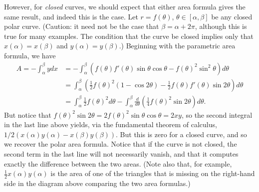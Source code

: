 \documentclass[letterpaper,12pt]{article}
\newcommand{\di}{\displaystyle}
\begin{document}
However, for {\em closed} curves, we should expect that either area formula gives the same result, and indeed this is the case. Let $r=f(\theta)$, $\theta\in [\alpha,\beta]$ be any closed polar curve. (Caution: it need not be the case that $\beta = \alpha+2\pi$, although this is true for many examples. The condition that the curve be closed implies only that $x(\alpha)=x(\beta)$ and $y(\alpha)=y(\beta)$.)
Beginning with the parametric area formula, we have
\begin{align*}
A = -\int_\alpha^\beta y dx & = -\int_\alpha^\beta \left(f(\theta)f'(\theta)\sin\theta\cos\theta -f(\theta)^2\sin^2\theta \right)d\theta\\
&= \int_\alpha^\beta \left(\frac{1}{2}f(\theta)^2(1-\cos 2\theta)-\frac{1}{2}f(\theta)f'(\theta)\sin 2\theta\right)d\theta\\
&= \int_\alpha^\beta \frac{1}{2}f(\theta)^2d\theta -\int_\alpha^\beta \frac{d}{d\theta}\left(\frac{1}{4}f(\theta)^2\sin 2\theta\right)d\theta.
\end{align*}
But notice that $f(\theta)^2\sin 2\theta = 2f(\theta)^2\sin\theta\cos\theta = 2xy$, so the second integral in the last line above yields, via the fundamental theorem of calculus, $1/2(x(\alpha)y(\alpha)-x(\beta)y(\beta))$. But this is zero for a closed curve, and so we recover the polar area formula. Notice that if the curve is not closed, the second term in the last line will not necessarily vanish, and that it computes exactly the difference between the two areas. (Note also that, for example, $\di \frac{1}{2}x(\alpha)y(\alpha)$ is the area of one of the triangles that is missing on the right-hand side in the diagram above comparing the two area formulas.)
\end{document}

